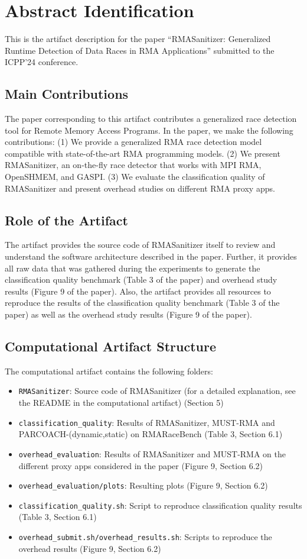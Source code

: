 \documentclass[twoside]{article}
\begin{document}
\section*{Abstract Identification}
This is the artifact description for the paper ``RMASanitizer: Generalized Runtime Detection of Data Races in RMA Applications'' submitted to the ICPP'24 conference.


\subsection*{Main Contributions}
The paper corresponding to this artifact contributes a generalized race detection tool for Remote Memory Access Programs. In the paper, we make the following contributions: (1) We provide a generalized RMA race detection model compatible with state-of-the-art RMA programming models. (2) We present RMASanitizer, an on-the-fly race detector that works with MPI RMA, OpenSHMEM, and GASPI. (3) We evaluate the classification quality of RMASanitizer and present overhead studies on different RMA proxy apps.

\subsection*{Role of the Artifact}
The artifact provides the source code of RMASanitizer itself to review and understand the software architecture described in the paper. Further, it provides all raw data that was gathered during the experiments to generate the classification quality benchmark (Table 3 of the paper) and overhead study results (Figure 9 of the paper). Also, the artifact provides all resources to reproduce the results of the classification quality benchmark (Table 3 of the paper) as well as the overhead study results (Figure 9 of the paper).


\subsection*{Computational Artifact Structure}
The computational artifact contains the following folders:
\begin{itemize}
    \item \texttt{RMASanitizer}: Source code of RMASanitizer (for a detailed explanation, see the README in the computational artifact) (Section 5)
    \item \texttt{classification\_quality}: Results of RMASanitizer, MUST-RMA and PARCOACH-(dynamic,static) on RMARaceBench (Table 3, Section 6.1)
    \item \texttt{overhead\_evaluation}: Results of RMASanitizer and MUST-RMA on the different proxy apps considered in the paper (Figure 9, Section 6.2)
    \item \texttt{overhead\_evaluation/plots}: Resulting plots (Figure 9, Section 6.2)
    \item \texttt{classification\_quality.sh}: Script to reproduce classification quality results (Table 3, Section 6.1)
    \item \texttt{overhead\_submit.sh/overhead\_results.sh}: Scripts to reproduce the overhead results (Figure 9, Section 6.2)
\end{itemize}
\end{document}
